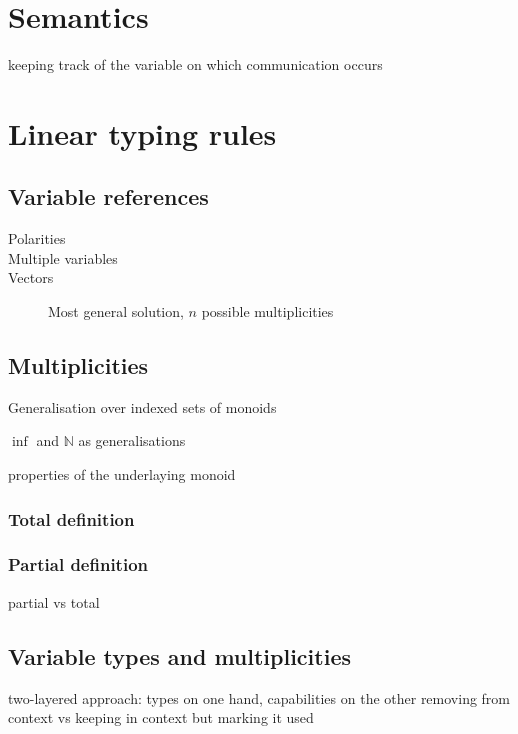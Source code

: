 \documentclass[a4paper,UKenglish,cleveref, autoref, thm-restate,authorcolumns]{lipics-v2019}
\begin{document}
\section{Semantics}

keeping track of the variable on which communication occurs

\section{Linear typing rules}

\subsection{Variable references}

\begin{description}
  \item[Polarities]
  \item[Multiple variables]
  \item[Vectors]
    Most general solution, $n$ possible multiplicities
\end{description}

\subsection{Multiplicities}

Generalisation over indexed sets of monoids

$\inf$ and $\mathbb{N}$ as generalisations

properties of the underlaying monoid

\subsubsection{Total definition}

\subsubsection{Partial definition}

partial vs total

\subsection{Variable types and multiplicities}

two-layered approach: types on one hand, capabilities on the other
removing from context vs keeping in context but marking it used
\end{document}
